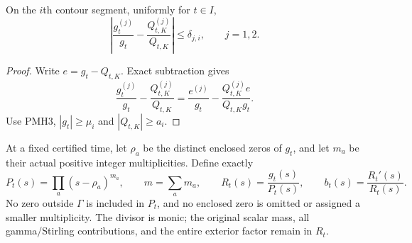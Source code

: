 \begin{pmreceivertheorem}
\label{pmreceiver:PMH5}
On the $i$th contour segment, uniformly for $t\in I$,
\begin{equation}\label{pmreceiver:PMH5-ratio}
 \left|\frac{g_t^{(j)}}{g_t}-\frac{Q_{t,K}^{(j)}}{Q_{t,K}}\right|
 \le\delta_{j,i},\qquad j=1,2.
\end{equation}
\end{pmreceivertheorem}
\begin{proof}
Write $e=g_t-Q_{t,K}$. Exact subtraction gives
\[
 \frac{g_t^{(j)}}{g_t}-\frac{Q_{t,K}^{(j)}}{Q_{t,K}}
 =\frac{e^{(j)}}{g_t}
       -\frac{Q_{t,K}^{(j)}e}{Q_{t,K}g_t}.
\]
Use PMH3, $|g_t|\ge\mu_i$ and $|Q_{t,K}|\ge a_i$.
\end{proof}

At a fixed certified time, let $\rho_a$ be the distinct enclosed
zeros of $g_t$, and let $m_a$ be their actual positive integer
multiplicities. Define exactly
\begin{equation}\label{pmreceiver:PMH6-divisor}
 P_t(s)=\prod_a(s-\rho_a)^{m_a},\qquad
 m=\sum_am_a,\qquad R_t(s)=\frac{g_t(s)}{P_t(s)},\qquad
 b_t(s)=\frac{R_t'(s)}{R_t(s)}.
\end{equation}
No zero outside $\Gamma$ is included in $P_t$, and no enclosed zero
is omitted or assigned a smaller multiplicity. The divisor is
monic; the original scalar mass, all gamma/Stirling contributions,
and the entire exterior factor remain in $R_t$.


